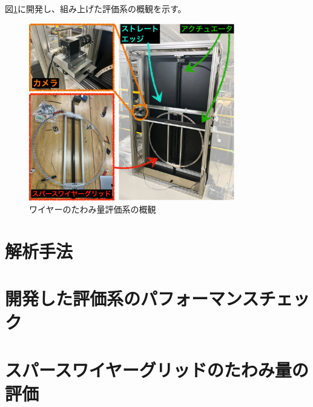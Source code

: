 \documentclass[../../main.tex]{subfiles}
\begin{document}
図\ref{fig:wiresag_system}に開発し、組み上げた評価系の概観を示す。


\begin{figure}
    \centering
    \includegraphics[width=0.8\textwidth]{wiresag/wiresag_system.pdf}
    \caption{ワイヤーのたわみ量評価系の概観}
    \label{fig:wiresag_system}
\end{figure}


\section{解析手法}

\section{開発した評価系のパフォーマンスチェック}

\section{スパースワイヤーグリッドのたわみ量の評価}
\end{document}
